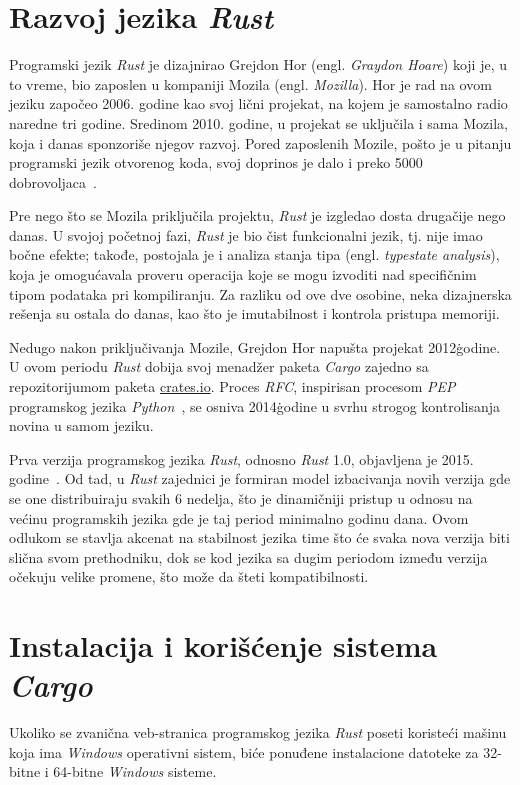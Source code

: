 \documentclass[12pt,oneside]{memoir}
\begin{document}
\section{Razvoj jezika \emph{Rust}}
Programski jezik \emph{Rust} je dizajnirao Grejdon Hor
(engl. \emph{Graydon Hoare}) koji je, u to vreme, bio zaposlen u kompaniji
Mozila (engl. \emph{Mozilla}).
Hor je rad na ovom jeziku započeo 2006. godine kao svoj lični projekat,
na kojem je samostalno radio naredne tri godine.
Sredinom 2010. godine, u projekat se
uključila i sama Mozila, koja i danas sponzoriše njegov razvoj.
Pored zaposlenih Mozile, pošto je u pitanju programski jezik otvorenog koda,
svoj doprinos je dalo i preko 5000 dobrovoljaca~\cite{thanks_rust}.

Pre nego što se Mozila priključila projektu, \emph{Rust} je izgledao dosta
drugačije nego danas. U svojoj početnoj fazi, \emph{Rust} je bio čist funkcionalni jezik,
tj. nije imao bočne efekte; takođe, postojala je i analiza stanja tipa
(engl. \emph{typestate analysis}), koja je omogućavala proveru operacija
koje se mogu izvoditi nad specifičnim tipom podataka pri kompiliranju. Za
razliku od ove dve osobine, neka dizajnerska rešenja su ostala do danas, kao
što je imutabilnost i kontrola pristupa memoriji.~\cite{history_rust}

Nedugo nakon priključivanja Mozile, Grejdon Hor napušta projekat
2012\. godine. U ovom periodu \emph{Rust} dobija svoj menadžer
paketa \emph{Cargo} zajedno sa repozitorijumom paketa \url{crates.io}.
Proces \emph{RFC}, inspirisan procesom \emph{PEP} programskog jezika
\emph{Python}~\cite{python_pep}, se
osniva 2014\. godine u svrhu strogog kontrolisanja novina u samom jeziku.

Prva verzija programskog jezika \emph{Rust}, odnosno \emph{Rust} 1.0, objavljena je 2015.
godine~\cite{stable_rust}. Od tad, u \emph{Rust} zajednici je formiran model izbacivanja novih
verzija gde se one distribuiraju svakih 6 nedelja, što je dinamičniji pristup
u odnosu na većinu programskih jezika gde je taj period minimalno godinu dana.
Ovom odlukom se stavlja akcenat na stabilnost jezika time što će svaka nova 
verzija biti slična svom prethodniku, dok se kod jezika sa dugim periodom 
između verzija očekuju velike promene, što može da šteti kompatibilnosti. 

\section{Instalacija i korišćenje sistema \emph{Cargo}}
Ukoliko se zvanična veb-stranica programskog jezika \emph{Rust} poseti koristeći
mašinu koja ima \emph{Windows} operativni sistem, biće ponuđene
instalacione datoteke za 32-bitne i 64-bitne \emph{Windows} sisteme.
\end{document}

